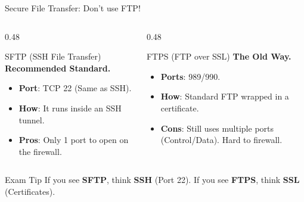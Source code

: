 \documentclass[aspectratio=169]{beamer}  %
\begin{document}
\begin{frame}{Secure File Transfer: Don't use FTP!}
    \begin{columns}[T]
        \begin{column}{0.48\textwidth}
            \begin{block}{SFTP (SSH File Transfer)}
                \small
                \textbf{Recommended Standard.}
                \begin{itemize}
                    \item \textbf{Port}: TCP 22 (Same as SSH).
                    \item \textbf{How}: It runs inside an SSH tunnel.
                    \item \textbf{Pros}: Only 1 port to open on the firewall.
                \end{itemize}
            \end{block}
        \end{column}
        \begin{column}{0.48\textwidth}
            \begin{block}{FTPS (FTP over SSL)}
                \small
                \textbf{The Old Way.}
                \begin{itemize}
                    \item \textbf{Ports}: 989/990.
                    \item \textbf{How}: Standard FTP wrapped in a certificate.
                    \item \textbf{Cons}: Still uses multiple ports (Control/Data). Hard to firewall.
                \end{itemize}
            \end{block}
        \end{column}
    \end{columns}
    \vspace{0.5cm}
    \begin{exampleblock}{Exam Tip}
        \small
        If you see \textbf{SFTP}, think \textbf{SSH} (Port 22). If you see \textbf{FTPS}, think \textbf{SSL} (Certificates).
    \end{exampleblock}
\end{frame}
\end{document}
